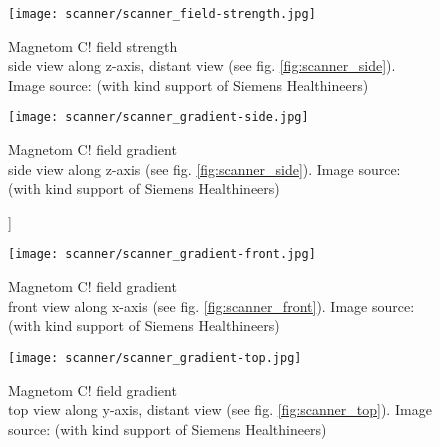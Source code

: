 \begin{figure}[!htb]
  	\centering
      \texttt{[image: scanner/scanner\_field-strength.jpg]}
      \caption[Magnetom C! field strength\\ side view along z-axis, distant view. Image source: \cite{magnetom_handbook}]{Magnetom C! field strength\\ side view along z-axis, distant view (see fig. \ref{fig:scanner_side}). Image source: \cite{magnetom_handbook} (with kind support of Siemens Healthineers)}
    \label{fig:strength_side}
\end{figure}

\begin{figure}[!htb]
    	\centering
        \texttt{[image: scanner/scanner\_gradient-side.jpg]}
        \caption[Magnetom C! field gradient\\ side view along z-axis. Image source: \cite{magnetom_handbook}]]{Magnetom C! field gradient\\ side view along z-axis (see fig. \ref{fig:scanner_side}). Image source: \cite{magnetom_handbook} (with kind support of Siemens Healthineers)}
        \label{fig:gradient_side}
\end{figure}

\begin{figure}[!htb]
  	\centering
    \texttt{[image: scanner/scanner\_gradient-front.jpg]}
    \caption[Magnetom C! field gradient\\ front view along x-axis. Image source: \cite{magnetom_handbook}]{Magnetom C! field gradient\\ front view along x-axis (see fig. \ref{fig:scanner_front}). Image source: \cite{magnetom_handbook} (with kind support of Siemens Healthineers)}
    \label{fig:gradient_front}
    \end{figure}

\begin{figure}[!htb]
  	\centering
    \texttt{[image: scanner/scanner\_gradient-top.jpg]}
    \caption[Magnetom C! field gradient\\ top view along y-axis, distant view. Image source: \cite{magnetom_handbook}]{Magnetom C! field gradient\\ top view along y-axis, distant view (see fig. \ref{fig:scanner_top}). Image source: \cite{magnetom_handbook} (with kind support of Siemens Healthineers)}
    \label{fig:gradient_top}
\end{figure}


